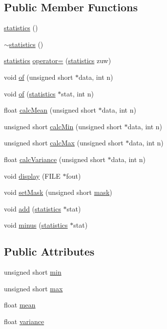 \subsection*{Public Member Functions}
\begin{DoxyCompactItemize}
\item 
\hyperlink{classstatistics_a31d6750c3251c979f5c2d013984e1162}{statistics} ()
\item 
\hyperlink{classstatistics_a8cf720227802726be118712dc6616f94}{$\sim$statistics} ()
\item 
\hyperlink{classstatistics}{statistics} \hyperlink{classstatistics_a7e1f497f3e4780616e26bee24f30944d}{operator=} (\hyperlink{classstatistics}{statistics} zuw)
\item 
void \hyperlink{classstatistics_ae1c996db4172cc4f3011870565703949}{of} (unsigned short $\ast$data, int n)
\item 
void \hyperlink{classstatistics_adc449c82af5a264a3056553f79a23e4b}{of} (\hyperlink{classstatistics}{statistics} $\ast$stat, int n)
\item 
float \hyperlink{classstatistics_a7b484fdc49bf285ada28a5f422c503ac}{calc\-Mean} (unsigned short $\ast$data, int n)
\item 
unsigned short \hyperlink{classstatistics_a11bc27c277c69da2d9c9b73f02a50b84}{calc\-Min} (unsigned short $\ast$data, int n)
\item 
unsigned short \hyperlink{classstatistics_a25386f47edfa8c646ed6e6db836533c6}{calc\-Max} (unsigned short $\ast$data, int n)
\item 
float \hyperlink{classstatistics_a4765a751c416d896665eb38ccdccae85}{calc\-Variance} (unsigned short $\ast$data, int n)
\item 
void \hyperlink{classstatistics_ae75932ba711d0db5989bca5d8e7c13fd}{display} (F\-I\-L\-E $\ast$fout)
\item 
void \hyperlink{classstatistics_af09b9e0004c0df961422b58816a40c73}{set\-Mask} (unsigned short \hyperlink{classstatistics_a6cef2b7af0c9455ba4d7a3be62920d92}{mask})
\item 
void \hyperlink{classstatistics_a1c3f661ec160e9651baf2f5150e7176c}{add} (\hyperlink{classstatistics}{statistics} $\ast$stat)
\item 
void \hyperlink{classstatistics_ab509d6761e6556fd9c8ef9d056b7f9f0}{minus} (\hyperlink{classstatistics}{statistics} $\ast$stat)
\end{DoxyCompactItemize}
\subsection*{Public Attributes}
\begin{DoxyCompactItemize}
\item 
unsigned short \hyperlink{classstatistics_a9ddfcd7403d9a4ace35979ac3ad59fda}{min}
\item 
unsigned short \hyperlink{classstatistics_a46d65241f719918224650310f2fddecc}{max}
\item 
float \hyperlink{classstatistics_a5eacad512b051c45016ffeed7b35fe21}{mean}
\item 
float \hyperlink{classstatistics_a1397e63632ef6a3b87abfd35eff6485c}{variance}
\end{DoxyCompactItemize}
